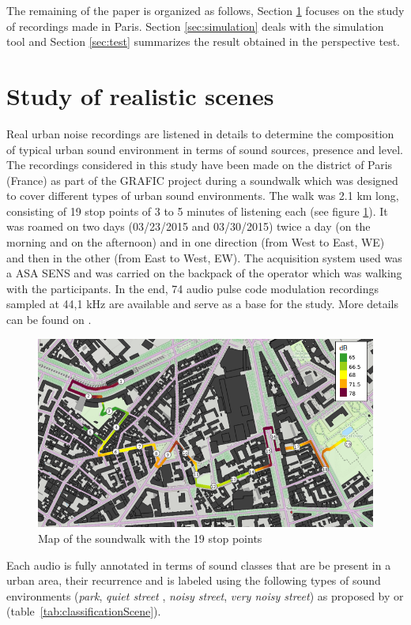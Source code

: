\documentclass[a4,11pt,twocolumn]{article}
\begin{document}
The remaining of the paper is organized as follows, Section \ref{sec:study} focuses on the study of recordings made in Paris. Section \ref{sec:simulation} deals with the simulation tool and Section \ref{sec:test} summarizes the result obtained in the perspective test.


\section{Study of realistic scenes} \label{sec:study}
Real urban noise recordings are listened in details to determine the composition of typical urban sound environment in terms of sound sources, presence and level. The recordings considered in this study have been made on the  district of Paris (France) as part of the GRAFIC project \cite{aumond_sound_2016} during a soundwalk which was designed to cover different types of urban sound environments. The walk was 2.1 km long, consisting of 19 stop points of 3 to 5 minutes of listening each (see figure \ref{fig:soundwalk}). It was roamed on two days (03/23/2015 and 03/30/2015) twice a day (on the morning and on the afternoon) and in one direction (from West to East, WE) and then in the other (from East to West, EW). The acquisition system used was a ASA SENS and was carried on the backpack of the operator which was walking with the participants. In the end, 74 audio pulse code modulation recordings sampled at 44,1 kHz are available and serve as a base for the study. More details can be found on  \cite{aumond_modelling_2017}. \\

\begin{figure}[H]
\centering
\includegraphics[width=.5\textwidth]{./pictures/trajet_19pts.png}
\caption{Map of the soundwalk with the 19 stop points}
\label{fig:soundwalk}
\end{figure}


Each audio is fully annotated in terms of sound classes that are be present in a urban area, their recurrence and is labeled using the following types of sound environments (\textit{park}, \textit{quiet street} , \textit{noisy street}, \textit{very noisy street}) as proposed by \cite{rychtarikova_soundscape_2013} or \cite{can_describing_2015} (table~\ref{tab:classificationScene}).
\end{document}
